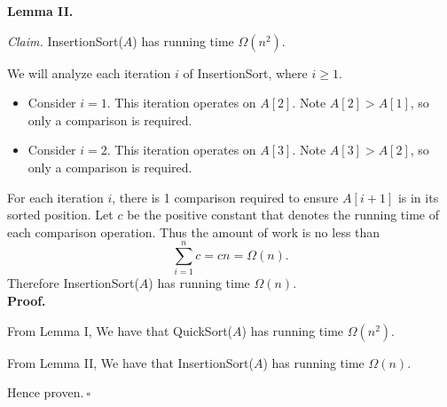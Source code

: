 \begin{enumerate}
\begin{solution}
\textbf{Lemma II.}

\textit{Claim. }{\sc InsertionSort}($A$) has running time $\Omega(n^2)$.

We will analyze each iteration $i$ of {\sc InsertionSort}, where $i\geq 1$.

\begin{itemize}
\item Consider $i=1$. This iteration operates on $A[2]$. Note $A[2]>A[1]$, so only a comparison is required.
\item Consider $i=2$. This iteration operates on $A[3]$. Note $A[3]>A[2]$, so only a comparison is required.
\end{itemize}
For each iteration $i$, there is 1 comparison required to ensure $A[i+1]$ is in its sorted position. Let $c$ be the positive constant that denotes the running time of each comparison operation. Thus the amount of work is no less than
\begin{equation*}
\sum_{i=1}^n{c}=cn=\Omega(n).
\end{equation*}
Therefore {\sc InsertionSort}($A$) has running time $\Omega(n)$.\\

\textbf{Proof. }

From Lemma I, We have that {\sc QuickSort}($A$) has running time $\Omega(n^2)$.

From Lemma II, We have that {\sc InsertionSort}($A$) has running time $\Omega(n)$.

Hence proven.$~\square$
\end{solution}
\end{enumerate}
\newpage
